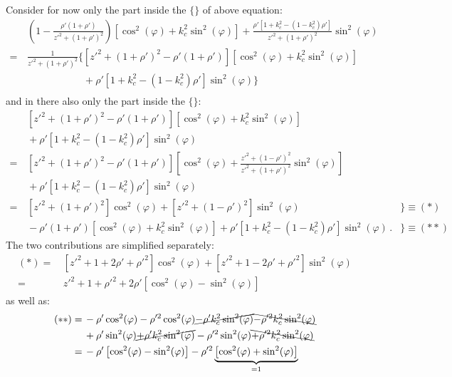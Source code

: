 Consider for now only the part inside the $\{\}$ of above equation:
\begin{align}
 ~&\,   \left( 1 - \frac{\rho' (1+\rho')}{z'^2 + (1 + \rho')^2} \right)
        \left[ \cos^2(\varphi) + k_c^2 \sin^2(\varphi) \right]
      + \frac{\rho' \left[1 + k_c^2 - (1 - k_c^2) \rho'\right]}{z'^2 + (1 + \rho')^2} \sin^2(\varphi) \nonumber \\
 =&\, \frac{1}{z'^2 + (1 + \rho')^2} \Biggl\{
        \left[ z'^2 + (1 + \rho')^2 - \rho' (1+\rho') \right] \left[ \cos^2(\varphi) + k_c^2 \sin^2(\varphi) \right] \nonumber \\
 ~&\, \phantom{\frac{1}{z'^2 + (1 + \rho')^2} \Biggl\{}
      + \rho' \left[1 + k_c^2 - (1 - k_c^2) \rho'\right] \sin^2(\varphi) \Biggr\}
\end{align}
and in there also only the part inside the $\{\}$:
\begin{align}
 ~&\, \left[ z'^2 + (1 + \rho')^2 - \rho' (1+\rho') \right] \left[ \cos^2(\varphi) + k_c^2 \sin^2(\varphi) \right] \nonumber \\
 ~&\, + \rho' \left[1 + k_c^2 - (1 - k_c^2) \rho'\right] \sin^2(\varphi) \nonumber \\
 =&\, \left[ z'^2 + (1 + \rho')^2 - \rho' (1+\rho') \right] \left[ \cos^2(\varphi) + \frac{z'^2 + (1 - \rho')^2}{z'^2 + (1 + \rho')^2} \sin^2(\varphi) \right] \nonumber \\
 ~&\, + \rho' \left[1 + k_c^2 - (1 - k_c^2) \rho'\right] \sin^2(\varphi) \nonumber \\
 =&\, \left[ z'^2 + (1 + \rho')^2 \right] \cos^2(\varphi) + \left[ z'^2 + (1 - \rho')^2 \right] \sin^2(\varphi)                                        & \Bigr\} \equiv (*)~\, \nonumber \\
 ~&\, - \rho' (1+\rho') \left[ \cos^2(\varphi) + k_c^2 \sin^2(\varphi) \right] + \rho' \left[1 + k_c^2 - (1 - k_c^2) \rho'\right] \sin^2(\varphi) \, . & \Bigr\} \equiv (**) \label{eqn:starStar}
\end{align}
The two contributions are simplified separately:
\begin{align}
 (*)
 =&\, \left[ z'^2 + 1 + 2 \rho' + \rho'^2 \right] \cos^2(\varphi) + \left[ z'^2 + 1 - 2 \rho' + \rho'^2  \right] \sin^2(\varphi) \nonumber \\
 =&\, z'^2 + 1 + \rho'^2 + 2 \rho' \left[ \cos^2(\varphi) - \sin^2(\varphi) \right]
\end{align}
as well as:
\begin{align}
  (**)
 =&\, - \rho' \cos^2(\varphi) - \rho'^2 \cos^2(\varphi) \cancel{- \rho' k_c^2 \sin^2(\varphi)}                           \bcancel{- \rho'^2 k_c^2 \sin^2(\varphi)} \nonumber \\
 ~&\, + \rho' \sin^2(\varphi)                           \cancel{+ \rho' k_c^2 \sin^2(\varphi)} - \rho'^2 \sin^2(\varphi) \bcancel{+ \rho'^2 k_c^2 \sin^2(\varphi)} \nonumber \\
 =&\, - \rho' \left[ \cos^2(\varphi) - \sin^2(\varphi) \right] - \rho'^2 \underbrace{\left[ \cos^2(\varphi) + \sin^2(\varphi) \right]}_{=1}
\end{align}
